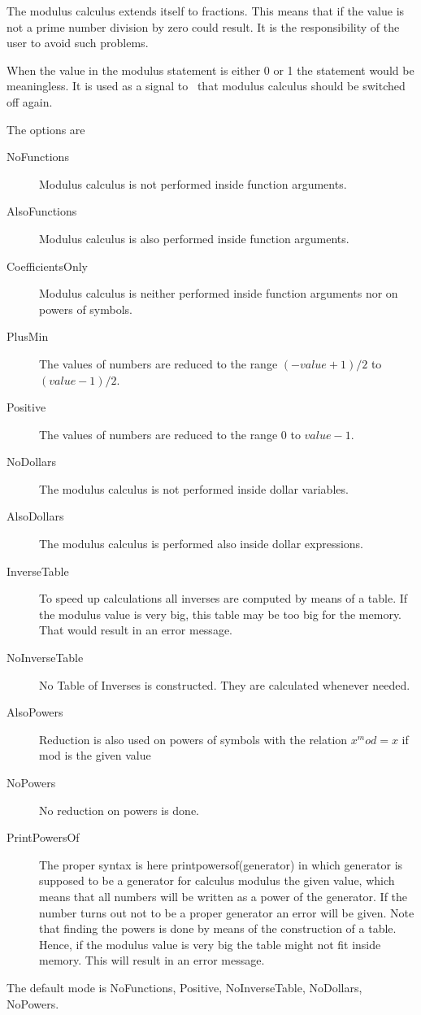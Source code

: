 \noindent The modulus calculus extends itself to 
fractions. This means that if the value is not a prime 
number division by zero could result. It is the responsibility of the user 
to avoid such problems.

\noindent When the value in the modulus statement is either 0 or 1 the 
statement would be meaningless. It is used as a signal to \FORM\ that modulus 
calculus should be switched off again.

The options are
\begin{description}
\item[NoFunctions] Modulus calculus is not performed inside function 
arguments.
\item[AlsoFunctions] Modulus calculus is also performed inside function 
arguments.
\item[CoefficientsOnly] Modulus calculus is neither performed inside function 
arguments nor on powers of symbols.
\item[PlusMin] The values of numbers are reduced to the range 
$(-value+1)/2$ to $(value-1)/2$.
\item[Positive] The values of numbers are reduced to the range $0$ to 
$value-1$.
\item[NoDollars] The modulus calculus is not performed inside dollar 
variables.
\item[AlsoDollars] The modulus calculus is performed also inside dollar 
expressions.
\item[InverseTable] To speed up calculations all inverses are computed by 
means of a table. If the modulus value is very big, this table may be too 
big for the memory. That would result in an error message.
\item[NoInverseTable] No Table of Inverses is constructed. They are 
calculated whenever needed.
\item[AlsoPowers] Reduction is also used on powers of symbols with the 
relation $x^mod = x$ if mod is the given value
\item[NoPowers] No reduction on powers is done.
\item[PrintPowersOf] The proper syntax is here printpowersof(generator) in 
which generator is supposed to be a generator for calculus modulus the 
given value, which means that all numbers will be written as a power of the 
generator. If the number turns out not to be a proper generator an error 
will be given. Note that finding the powers is done by means of the 
construction of a table. Hence, if the modulus value is very big the table 
might not fit inside memory. This will result in an error message.
\end{description}
The default mode is NoFunctions, Positive, NoInverseTable, NoDollars, 
NoPowers.

